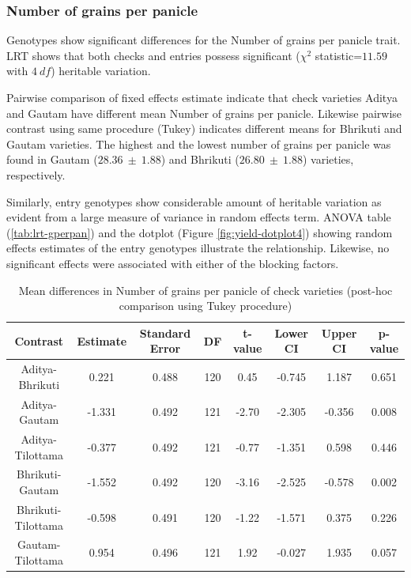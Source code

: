 \documentclass[12pt,oneside]{dukestatscithesis} %
\theoremstyle{definition}
\theoremstyle{definition}
\theoremstyle{definition}
\theoremstyle{remark}
\begin{document}
\subsubsection{Number of grains per
panicle}\label{number-of-grains-per-panicle}

Genotypes show significant differences for the Number of grains per
panicle trait. LRT shows that both checks and entries possess
significant (\(\chi^2\) statistic=\(11.59\) with \(4\ df\)) heritable
variation.

Pairwise comparison of fixed effects estimate indicate that check
varieties Aditya and Gautam have different mean Number of grains per
panicle. Likewise pairwise contrast using same procedure (Tukey)
indicates different means for Bhrikuti and Gautam varieties. The highest
and the lowest number of grains per panicle was found in Gautam
(\(28.36\ \pm\ 1.88\)) and Bhrikuti (\(26.80\ \pm\ 1.88\)) varieties,
respectively.

Similarly, entry genotypes show considerable amount of heritable
variation as evident from a large measure of variance in random effects
term. ANOVA table (\ref{tab:lrt-gperpan}) and the dotplot (Figure
\ref{fig:yield-dotplot4}) showing random effects estimates of the entry
genotypes illustrate the relationship. Likewise, no significant effects
were associated with either of the blocking factors.
\begin{table}[H]

\caption{\label{tab:yield-meanconf-tab4}Mean differences in Number of grains per panicle of check varieties (post-hoc comparison using Tukey procedure)}
\centering
\begin{tabular}[t]{cccccccc}
\toprule
Contrast & Estimate & Standard Error & DF & t-value & Lower CI & Upper CI & p-value\\
\midrule
Aditya-Bhrikuti & 0.221 & 0.488 & 120 & 0.45 & -0.745 & 1.187 & 0.651\\
Aditya-Gautam & -1.331 & 0.492 & 121 & -2.70 & -2.305 & -0.356 & 0.008\\
Aditya-Tilottama & -0.377 & 0.492 & 121 & -0.77 & -1.351 & 0.598 & 0.446\\
Bhrikuti-Gautam & -1.552 & 0.492 & 120 & -3.16 & -2.525 & -0.578 & 0.002\\
Bhrikuti-Tilottama & -0.598 & 0.491 & 120 & -1.22 & -1.571 & 0.375 & 0.226\\
Gautam-Tilottama & 0.954 & 0.496 & 121 & 1.92 & -0.027 & 1.935 & 0.057\\
\bottomrule
\end{tabular}
\end{table}
\end{document}
